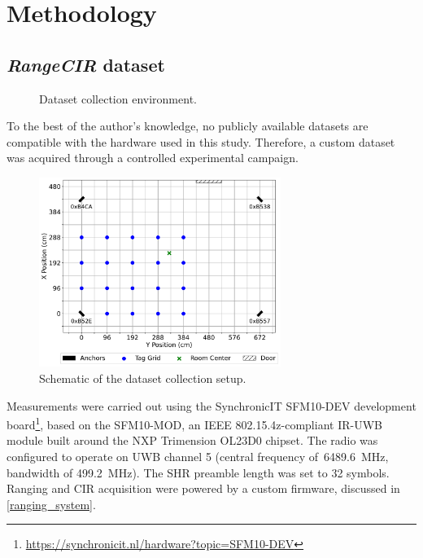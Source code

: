 \chapter{Methodology}

\section{\textit{RangeCIR} dataset}\label{data_collection}

\begin{figure}[tbh]
    \centering
    \caption{Dataset collection environment.}
    \label{fig:dataset_setup}
\end{figure} 

To the best of the author's knowledge, no publicly available datasets are compatible with the hardware used in this study. Therefore, a custom dataset was acquired through a controlled experimental campaign.

\begin{figure}[tbh]
\hspace*{-25pt} %
\includegraphics[width=0.7\textwidth]{Figures/methodology/dataset_scheme.pdf}
\centering
\caption{Schematic of the dataset collection setup.}
\label{fig:exp_topology}
\end{figure}

Measurements were carried out using the SynchronicIT SFM10-DEV development board\footnote{\url{https://synchronicit.nl/hardware?topic=SFM10-DEV}}, based on the SFM10-MOD, an IEEE 802.15.4z-compliant IR-UWB module built around the NXP Trimension OL23D0 chipset. The radio was configured to operate on UWB channel 5 (central frequency of~\SI{6489.6}{\mega\hertz}, bandwidth of \SI{499.2}{\mega\hertz}). The SHR preamble length was set to 32 symbols. Ranging and CIR acquisition were powered by a custom firmware, discussed in \autoref{ranging_system}. 

